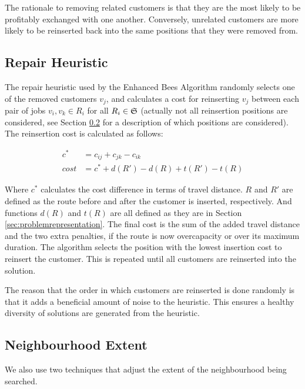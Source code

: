 The rationale to removing related customers is that they are the most likely to be profitably exchanged with one another. Conversely, unrelated customers are more likely to be reinserted back into the same positions that they were removed from. 

\subsection{Repair Heuristic}
\label{subsec:repairheuristic}

The repair heuristic used by the Enhanced Bees Algorithm randomly selects one of the removed customers $v_j$, and calculates a cost for reinserting $v_j$ between each pair of jobs $v_i, v_k \in R_i$ for all $R_i \in \mathfrak{S}$ (actually not all reinsertion positions are considered, see Section \ref{subsec:neighborhoodscope} for a description of which positions are considered). The reinsertion cost is calculated as follows:

\begin{align}
   c^*   &= c_{ij} + c_{jk} - c_{ik} \\
   cost  &= c^* + d(R') - d(R) + t(R') - t(R)
\end{align}

Where $c^*$ calculates the cost difference in terms of travel distance. $R$ and $R'$ are defined as the route before and after the customer is inserted, respectively. And functions $d(R)$ and $t(R)$ are all defined as they are in Section \ref{sec:problemrepresentation}. The final cost is the sum of the added travel distance and the two extra penalties, if the route is now overcapacity or over its maximum duration. The algorithm selects the position with the lowest insertion cost to reinsert the customer. This is repeated until all customers are reinserted into the solution. 

The reason that the order in which customers are reinserted is done randomly is that it adds a beneficial amount of noise to the heuristic. This ensures a healthy diversity of solutions are generated from the heuristic. 

\subsection{Neighbourhood Extent}
\label{subsec:neighborhoodscope}

We also use two techniques that adjust the extent of the neighbourhood being searched. 

